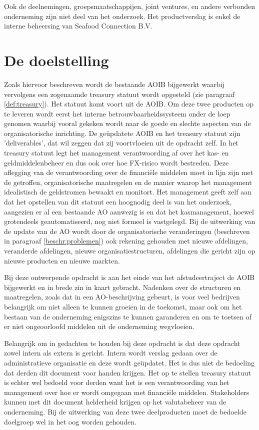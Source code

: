 Ook de deelnemingen, groepsmaatschappijen, joint ventures, en andere verbonden onderneming zijn niet deel van het onderzoek. Het productverslag is enkel de interne beheersing van Seafood Connection B.V.

\newpage
\section{De doelstelling}
Zoals hiervoor beschreven wordt de bestaande AOIB bijgewerkt waarbij vervolgens een zogenaamde treasury statuut wordt opgesteld (zie paragraaf \ref{def:treasury}). Het statuut komt voort uit de AOIB. 
Om deze twee producten op te leveren wordt eerst het interne betrouwbaarheidssysteem onder de loep genomen waarbij vooral gekeken wordt naar de goede en slechte aspecten van de organisatorische inrichting. De geüpdatete AOIB en het treasury statuut zijn 'deliverables', dat wil zeggen dat zij voortvloeien uit de opdracht zelf. In het treasury statuut legt het management verantwoording af over het kas- en geldmiddelenbeheer en dus ook over hoe FX-risico wordt bestreden. Deze aflegging van de verantwoording over de financiële middelen moet in lijn zijn met de getroffen, organisatorische maatregelen en de manier waarop het management idealistisch de geldstromen bewaakt en monitort. Het management geeft zelf aan dat het opstellen van dit statuut een hoognodig deel is van het onderzoek, aangezien er al een bestaande AO aanwezig is en dat het kasmanagement, hoewel grotendeels geautomatiseerd, nog niet formeel is vastgelegd. Bij de uitwerking van de update van de AO wordt door de organisatorische veranderingen (beschreven in paragraaf \ref{beschr:problemen}) ook rekening gehouden met nieuwe afdelingen, veranderde afdelingen, nieuwe organisatiestructuren, afdelingen die gericht zijn op nieuwe producten en nieuwe markten.

Bij deze ontwerpende opdracht is aan het einde van het afstudeertraject de AOIB bijgewerkt en in brede zin in kaart gebracht. Nadenken over de structuren en maatregelen, zoals dat in een AO-beschrijving gebeurt, is voor veel bedrijven belangrijk om niet alleen te kunnen groeien in de toekomst, maar ook om het bestaan van de onderneming enigszins te kunnen garanderen en om te toetsen of er niet ongeoorloofd middelen uit de onderneming wegvloeien.

Belangrijk om in gedachten te houden bij deze opdracht is dat deze opdracht zowel intern als extern is gericht. Intern wordt verslag gedaan over de administratieve organisatie en deze wordt geüpdatet. Het is dus niet de bedoeling dat derden dit document voor handen krijgen. Het op te stellen treasury statuut is echter wel bedoeld voor derden want het is een verantwoording van het management over hoe er wordt omgegaan met financiële middelen. Stakeholders kunnen met dit document helderheid krijgen op het valutabeheer van de onderneming. Bij de uitwerking van deze twee deelproducten moet de bedoelde doelgroep wel in het oog worden gehouden.

